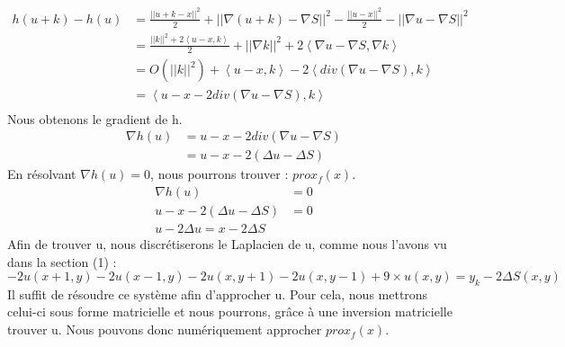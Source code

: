 \begin{equation*}
\begin{aligned}
h(u+k) -h(u) &= \frac{||u+k-x||^2}{2}+||\nabla  (u+k) -\nabla S ||^2- \frac{||u-x||^2}{2}-||\nabla u -\nabla S ||^2\\
& = \frac{||k||^2+2\left<u-x,k\right>}{2}+||\nabla k||^2+2\left<\nabla u-\nabla S, \nabla k\right>\\
& = O(||k||^2)+\left<u-x,k\right>-2\left<div(\nabla u-\nabla S), k\right>\\
& = \left<u-x-2div(\nabla u-\nabla S), k\right>\\
\end{aligned}
\end{equation*}
Nous obtenons le gradient de h.
\begin{equation*}
\begin{aligned}
\nabla h(u) &= u-x-2div(\nabla u - \nabla S)\\
& = u-x-2(\Delta u -\Delta S)
\end{aligned}
\end{equation*}
En résolvant $\nabla h(u) = 0$, nous pourrons trouver  : $prox_f(x) $. \\	
	\begin{equation*}
		\begin{aligned}
		\nabla h(u) &= 0\\
		u-x-2(\Delta u -\Delta S) & =0\\
		u-2\Delta u = x-2\Delta S
		\end{aligned}
\end{equation*}
Afin de trouver u, nous discrétiserons le Laplacien de u, comme nous l'avons vu dans la section (1) : 
\begin{equation*}
 -2u(x+1,y) -2 u(x-1,y)-2u(x,y+1) -2 u(x,y-1) +9\times u(x,y) =  y_k-  2\Delta S(x,y)
\end{equation*}
Il suffit de résoudre ce système afin d'approcher u. Pour cela, nous mettrons celui-ci sous forme matricielle et nous pourrons, grâce à une inversion matricielle trouver u. 
Nous pouvons donc numériquement approcher $prox_f(x)$.

